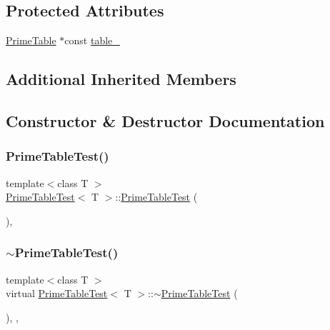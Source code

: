 \subsection*{Protected Attributes}
\begin{DoxyCompactItemize}
\item 
\hyperlink{class_prime_table}{Prime\+Table} $\ast$const \hyperlink{class_prime_table_test_a86da90fc6d5cef6386d0cd8fb52b4046}{table\+\_\+}
\end{DoxyCompactItemize}
\subsection*{Additional Inherited Members}


\subsection{Constructor \& Destructor Documentation}
\mbox{\label{class_prime_table_test_ab83d0b24b41bff1ace55f9a8d5ea6dcf}} 
\subsubsection{\texorpdfstring{Prime\+Table\+Test()}{PrimeTableTest()}}
{\footnotesize\ttfamily template$<$class T $>$ \\
\hyperlink{class_prime_table_test}{Prime\+Table\+Test}$<$ T $>$\+::\hyperlink{class_prime_table_test}{Prime\+Table\+Test} (\begin{DoxyParamCaption}{ }\end{DoxyParamCaption})\hspace{0.3cm}{\ttfamily [inline]}, {\ttfamily [protected]}}

\mbox{\label{class_prime_table_test_a4fb27ce277675d58ea3f8db99e3bb2b4}} 
\subsubsection{\texorpdfstring{$\sim$\+Prime\+Table\+Test()}{~PrimeTableTest()}}
{\footnotesize\ttfamily template$<$class T $>$ \\
virtual \hyperlink{class_prime_table_test}{Prime\+Table\+Test}$<$ T $>$\+::$\sim$\hyperlink{class_prime_table_test}{Prime\+Table\+Test} (\begin{DoxyParamCaption}{ }\end{DoxyParamCaption})\hspace{0.3cm}{\ttfamily [inline]}, {\ttfamily [protected]}, {\ttfamily [virtual]}}




